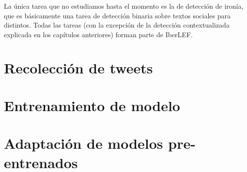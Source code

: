 La única tarea que no estudiamos hasta el momento es la de detección de ironía, que es básicamente una tarea de detección binaria sobre textos sociales para distintos. Todas las tareas (con la excepción de la detección contextualizada explicada en los capítulos anteriores) forman parte de IberLEF.

\section{Recolección de tweets}

\section{Entrenamiento de modelo}

\section{Adaptación de modelos pre-entrenados}
